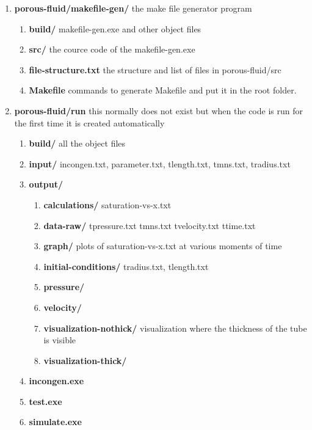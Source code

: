 \documentclass[
	12pt
] {article}
\begin{document}
\begin{enumerate}
		\item \textbf{porous-fluid/makefile-gen/} the make file generator program
			\begin{enumerate}
				\item \textbf{build/} makefile-gen.exe and other object files
				\item \textbf{src/} the cource code of the makefile-gen.exe
				\item \textbf{file-structure.txt} the structure and list of files in porous-fluid/src
				\item \textbf{Makefile} commands to generate Makefile and put it in the root folder.
			\end{enumerate}
		\item \textbf{porous-fluid/run} this normally does not exist but when the code is run for the first time it is created automatically
			\begin{enumerate}
				\item \textbf{build/} all the object files
				\item \textbf{input/} incongen.txt, parameter.txt, tlength.txt, tmns.txt, tradius.txt
				\item \textbf{output/}
					\begin{enumerate}
						\item \textbf{calculations/} saturation-vs-x.txt
						\item \textbf{data-raw/} tpressure.txt tmns.txt tvelocity.txt ttime.txt
						\item \textbf{graph/} plots of saturation-vs-x.txt at various moments of time
						\item \textbf{initial-conditions/} tradius.txt, tlength.txt
						\item \textbf{pressure/}
						\item \textbf{velocity/}
						\item \textbf{visualization-nothick/} visualization where the thickness of the tube is visible
						\item \textbf{visualization-thick/}
					\end{enumerate}
				\item \textbf{incongen.exe}
				\item \textbf{test.exe}
				\item \textbf{simulate.exe}
			\end{enumerate}
	\end{enumerate}
\end{document}
